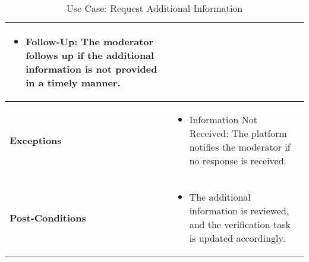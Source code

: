 \begin{table}[!ht]
\begin{tabularx}{\textwidth}{|l|X|}
\begin{itemize}[label=--,itemsep=0pt]
            \item Follow-Up: The moderator follows up if the additional information is not provided in a timely manner.
        \end{itemize} \\
        \hline
        \textbf{Exceptions} & 
        \begin{itemize}[label=--,itemsep=0pt]
            \item Information Not Received: The platform notifies the moderator if no response is received.
        \end{itemize} \\
        \hline
        \textbf{Post-Conditions} & 
        \begin{itemize}[label=--,itemsep=0pt]
            \item The additional information is reviewed, and the verification task is updated accordingly.
        \end{itemize} \\
        \hline
    \end{tabularx}
    \caption{Use Case: Request Additional Information}
    \label{tab:use-case-request-additional-information}
\end{table}



